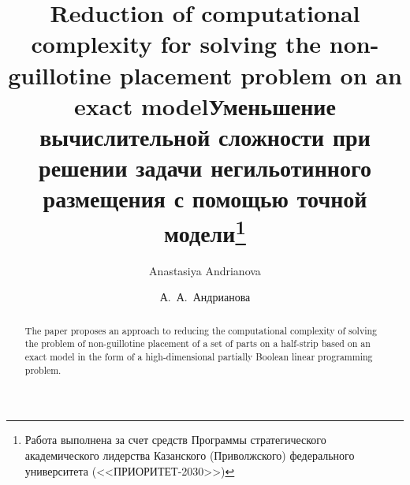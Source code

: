\begin{englishtitle} %
\title{Reduction of computational complexity for solving the non-guillotine placement problem on an exact model}
\author{Anastasiya Andrianova 
}
\maketitle

\begin{abstract}
The paper proposes an approach to reducing the computational complexity of solving the problem of non-guillotine placement of a set of parts on a half-strip based on an exact model in the form of a high-dimensional partially Boolean linear programming problem.

\end{abstract}
\end{englishtitle}

\iffalse
%
%


\documentclass[12pt]{llncs}  


\usepackage{iftex}

\ifPDFTeX
\usepackage[T2A]{fontenc}
\usepackage[utf8]{inputenc} %
\usepackage[english,russian]{babel}
\fi

\usepackage{todonotes} 

\usepackage[russian]{nla}


\fi

\title{Уменьшение вычислительной сложности при решении задачи негильотинного размещения с помощью точной модели\thanks{ Работа выполнена за счет средств Программы стратегического академического лидерства Казанского
(Приволжского) федерального университета (<<ПРИОРИТЕТ-2030>>)}}
\author{А.~А.~Андрианова
}

